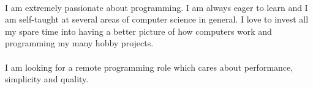 \paragraph*{}
I am extremely passionate about programming. I am always eager to learn and I am self-taught at several areas of computer science in general. I love to invest all my spare time into having a better picture of how computers work and programming my many hobby projects.
\paragraph*{}
I am looking for a remote programming role which cares about performance, simplicity and quality.